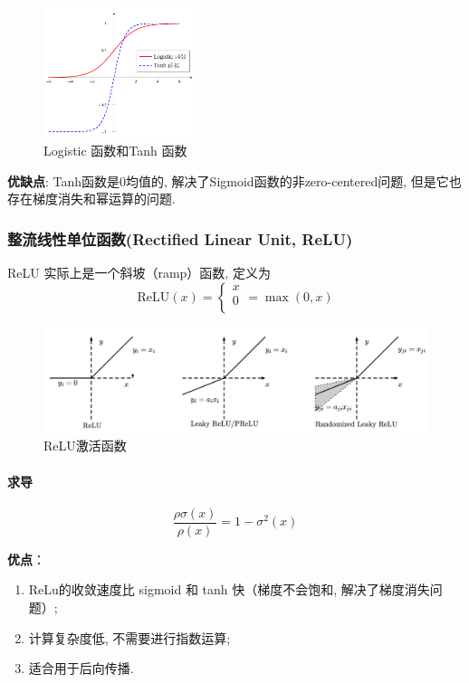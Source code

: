 \documentclass[a4paper]{article}
\begin{document}
\begin{figure}[!ht]
    \centering
    \includegraphics[width=0.4\textwidth]{sigmoid_function.png}
    \caption{Logistic 函数和Tanh 函数}
\end{figure}

\textbf{优缺点}:
Tanh函数是0均值的, 解决了Sigmoid函数的非zero-centered问题, 但是它也存在梯度消失和幂运算的问题.


\subsubsection{整流线性单位函数(Rectified Linear Unit,  ReLU)}
ReLU 实际上是一个斜坡（ramp）函数, 定义为
$$\mathrm{ReLU}(x)=
\left\{ 
\begin{array}{c}    x \\    0  \\   \end{array}
\right. =\max(0, x)
$$
\begin{figure}[!ht]
    \centering
    \includegraphics[width=\textwidth]{ReLU}
    \caption{ReLU激活函数}
\end{figure}
\paragraph{求导}
$$\frac{\rho\sigma(x)}{\rho(x)}=1-\sigma^2(x)$$

\textbf{优点}：
\begin{enumerate}
    \renewcommand{\labelenumi}{(\theenumi)}
    \item   ReLu的收敛速度比 sigmoid 和 tanh 快（梯度不会饱和, 解决了梯度消失问题）;
     \item  计算复杂度低, 不需要进行指数运算;
     \item 适合用于后向传播.
\end{enumerate}
\end{document}
